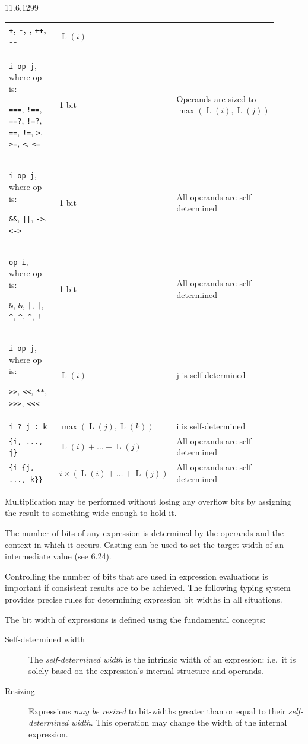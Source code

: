 \documentclass{article}
\newcommand{\add}{\color{darkgreen}}
\DeclareMathOperator{\Size}{L}
\newcommand{\tild}{\raisebox{-.7ex}{\textasciitilde{}}}
\newcommand{\sds}{\emph{self-determined width}}
\newcommand{\mbr}{\emph{may be resized}}
\newcommand{\unOp}{\texttt{+}, \texttt{-}, \texttt{\tild}, \texttt{++},
  \texttt{-{}-}}
\newcommand{\shiftOp}{\texttt{>{}>}, \texttt{<}\texttt{<}, \texttt{**},
  \texttt{>{}>{}>}, \texttt{<}\texttt{<}\texttt{<}}
\newcommand{\compOp}{\texttt{===}, \texttt{!==}, \texttt{==?}, \texttt{!=?},
  \texttt{==}, \texttt{!=}, \texttt{>}, \texttt{>=}, \texttt{<}, \texttt{<=}}
\newcommand{\logicOp}{\texttt{\&\&}, \texttt{||}, \texttt{->}, \texttt{<->}}
\newcommand{\redOp}{\texttt{\&}, \texttt{\tild\&}, \texttt{|}, \texttt{\tild|},
\texttt{\^{}}, \texttt{\tild\^{}}, \texttt{\^{}\tild}, \texttt{!}}
\begin{document}
\begin{lrmquote}{11.6.1}{299}
{\begin{center}
\begin{longtable}{|p{0.35\linewidth}|C{0.25\linewidth}|C{0.3\linewidth}|}
        \unOp{}
         & $\Size(i)$
         &
        \\
        \hline
        \verb|i op j|, where op is:

        \compOp{}
         & 1 bit
         & Operands are sized to $\max\left(\Size(i), \Size(j)\right)$ \\
        \hline
        \verb|i op j|, where op is:

        \logicOp{}
         & 1 bit
         & All operands are self-determined
        \\
        \hline
        \verb|op i|, where op is:

        \redOp{}
         & 1 bit
         & All operands are self-determined
        \\
        \hline
        \verb|i op j|, where op is:

        \shiftOp{}
         & $\Size(i)$
         & j is self-determined
        \\
        \hline
        \verb|i ? j : k|
         & $\max\left(\Size(j), \Size(k)\right)$
         & i is self-determined
        \\
        \hline
        \verb|{i, ..., j}|
         & $\Size(i) + \dots + \Size(j)$
         & All operands are self-determined
        \\
        \hline
        \verb|{i {j, ..., k}}|
         & $i\times\left(\Size(i) + \dots + \Size(j)\right)$
         & All operands are self-determined
        \\
        \hline
      \end{longtable}
    \end{center}

    Multiplication may be performed without losing any overflow bits by assigning
    the result to something wide enough to hold it.
  }

\end{lrmquote}
{
\add{}
The number of bits of any expression is determined by the operands and the
context in which it occurs. Casting can be used to set the target width of an
intermediate value (see 6.24).

Controlling the number of bits that are used in expression evaluations is
important if consistent results are to be achieved. The following typing system
provides precise rules for determining expression bit widths in all situations.

The bit width of expressions is defined using the fundamental concepts:

\begin{description}
  \item[Self-determined width]
    The \sds{} is the intrinsic width of an expression: i.e.~it is
    solely based on the expression's internal structure and operands.

  \item[Resizing]
    Expressions \mbr{} to bit-widths greater than or equal to their \sds{}. This
    operation may change the width of the internal expression.
\end{description}
}
\end{document}
